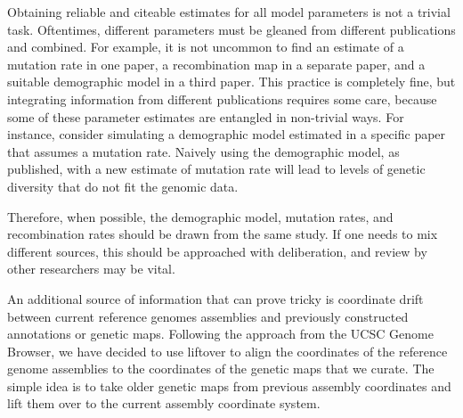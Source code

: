 \documentclass[hidelinks]{article}
\newcommand{\stdpopsim}{\texttt{stdpopsim}\xspace}
\begin{document}

Obtaining reliable and citeable estimates for all model parameters is not a trivial task.
Oftentimes, different parameters must be gleaned from different publications and combined.
For example, it is not uncommon to find an estimate of a mutation rate in one paper,
a recombination map in a separate paper, and a suitable demographic model in a third paper.
This practice is completely fine, but integrating information from different publications requires some care,
because some of these parameter estimates are entangled in non-trivial ways.
For instance, consider simulating a demographic model estimated in a specific paper that assumes
a mutation rate. Naively using the demographic model, as published, with a new estimate of mutation rate
will lead to levels of genetic diversity that do not fit the genomic data.
%


%
Therefore, when possible, the demographic model, mutation rates,
and recombination rates should be drawn from the same study.
If one needs to mix different sources, this should be approached with deliberation,
and review by other researchers may be vital.

An additional source of information that can prove tricky is coordinate drift between current
reference genomes assemblies and previously constructed annotations or genetic maps.
Following the approach from the UCSC Genome Browser, we have decided to use liftover
to align the coordinates of the reference genome assemblies to the coordinates of the
genetic maps that we curate. The simple idea is to take older genetic maps from
previous assembly coordinates and lift them over to the current assembly coordinate system.
\end{document}
